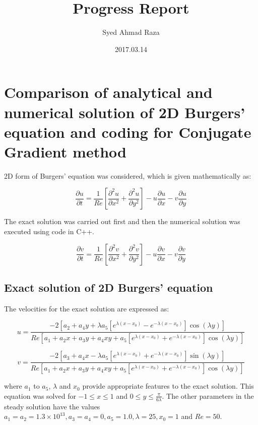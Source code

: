 \documentclass[12pt,a4paper,fleqn]{article}
\title{Progress Report}
\author{Syed Ahmad Raza}
\date{2017.03.14}
\begin{document}
\maketitle
\section*{Comparison of analytical and numerical solution of 2D Burgers'
equation and coding for Conjugate Gradient method}

2D form of Burgers' equation was considered, which is given mathematically as:

\begin{equation}
\frac{\partial u}{\partial t} = \frac{1}{Re}\left[\frac{\partial^2u}{\partial
x^2} + \frac{\partial^2u}{\partial y^2}\right] - u
\frac{\partial u}{\partial x} - v \frac{\partial u}{\partial y}
\end{equation}

The exact solution was carried out first and then the numerical solution was
executed using code in C++.

\begin{equation}
\frac{\partial v}{\partial t} = \frac{1}{Re}\left[\frac{\partial^2v}{\partial
x^2} + \frac{\partial^2v}{\partial y^2}\right] - u
\frac{\partial v}{\partial x} - v \frac{\partial v}{\partial y}
\end{equation}

\subsection*{Exact solution of 2D Burgers' equation}
The velocities for the exact solution are expressed as:

\begin{equation}
u = \frac{-2[a_2 + a_4y + \lambda a_5[e^{\lambda (x - x_0)} - e^{-\lambda (x -
x_0)}]\cos(\lambda y)]}{Re[a_1 + a_2x + a_3y + a_4xy + a_5[e^{\lambda (x - x_0)} + e^{-\lambda (x -
x_0)}]\cos(\lambda y)]}
\end{equation}

\begin{equation}
v = \frac{-2[a_3 + a_4x - \lambda a_5[e^{\lambda (x - x_0)} + e^{-\lambda (x -
x_0)}]\sin(\lambda y)]}{Re[a_1 + a_2x + a_3y + a_4xy + a_5[e^{\lambda (x - x_0)}
+ e^{-\lambda (x - x_0)}]\cos(\lambda y)]}
\end{equation}

where $a_1$ to $a_5$, $\lambda$ and $x_0$ provide appropriate features
to the exact solution. This equation was solved for $-1\leq x \leq 1$ and
$0 \leq y \leq \frac{\pi}{6\lambda}$. The other parameters in the steady solution
have the values $a_1 = a_2 = 1.3 \times 10^{13}, a_3 = a_4 = 0, a_5 = 1.0, \lambda = 25, x_0 =
1$ and $Re = 50$.
\end{document}
